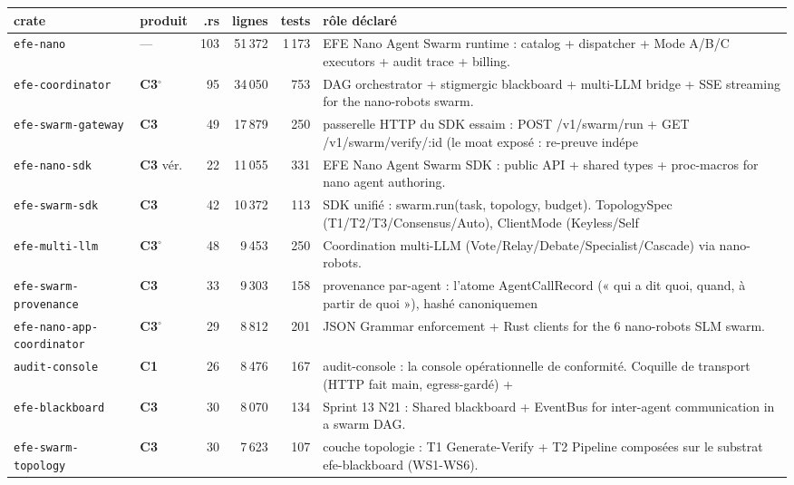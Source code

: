 \documentclass[10pt]{report}
\newcommand{\code}[1]{\texttt{\small #1}}
\newcommand{\ctrois}{\textcolor{c3col}{\textbf{C3}}}
\newcommand{\cun}{\textcolor{c1col}{\textbf{C1}}}
\begin{document}
\begin{longtable}{@{}p{4.3cm}p{1.6cm}r r r p{5.7cm}@{}}
\toprule \textbf{crate} & \textbf{produit} & \textbf{.rs} & \textbf{lignes} & \textbf{tests} & \textbf{rôle déclaré} \\ \midrule \endhead
\code{efe-nano} & --- & 103 & 51\,372 & 1\,173 & \footnotesize EFE Nano Agent Swarm runtime : catalog + dispatcher + Mode A/B/C executors + audit trace + billing. \\
\code{efe-coordinator} & \ctrois{}$^{\circ}$ & 95 & 34\,050 & 753 & \footnotesize DAG orchestrator + stigmergic blackboard + multi-LLM bridge + SSE streaming for the nano-robots swarm. \\
\code{efe-swarm-gateway} & \ctrois{} & 49 & 17\,879 & 250 & \footnotesize passerelle HTTP du SDK essaim : POST /v1/swarm/run + GET /v1/swarm/verify/:id (le moat exposé : re-preuve indépe \\
\code{efe-nano-sdk} & \ctrois{} vér. & 22 & 11\,055 & 331 & \footnotesize EFE Nano Agent Swarm SDK : public API + shared types + proc-macros for nano agent authoring. \\
\code{efe-swarm-sdk} & \ctrois{} & 42 & 10\,372 & 113 & \footnotesize SDK unifié : swarm.run(task, topology, budget). TopologySpec (T1/T2/T3/Consensus/Auto), ClientMode (Keyless/Self \\
\code{efe-multi-llm} & \ctrois{}$^{\circ}$ & 48 & 9\,453 & 250 & \footnotesize Coordination multi-LLM (Vote/Relay/Debate/Specialist/Cascade) via nano-robots. \\
\code{efe-swarm-provenance} & \ctrois{} & 33 & 9\,303 & 158 & \footnotesize provenance par-agent : l'atome AgentCallRecord (« qui a dit quoi, quand, à partir de quoi »), hashé canoniquemen \\
\code{efe-nano-app-coordinator} & \ctrois{}$^{\circ}$ & 29 & 8\,812 & 201 & \footnotesize JSON Grammar enforcement + Rust clients for the 6 nano-robots SLM swarm. \\
\code{audit-console} & \cun{} & 26 & 8\,476 & 167 & \footnotesize audit-console : la console opérationnelle de conformité. Coquille de transport (HTTP fait main, egress-gardé) + \\
\code{efe-blackboard} & \ctrois{} & 30 & 8\,070 & 134 & \footnotesize Sprint 13 N21 : Shared blackboard + EventBus for inter-agent communication in a swarm DAG. \\
\code{efe-swarm-topology} & \ctrois{} & 30 & 7\,623 & 107 & \footnotesize couche topologie : T1 Generate-Verify + T2 Pipeline composées sur le substrat efe-blackboard (WS1-WS6). \\

\end{longtable}
\end{document}
